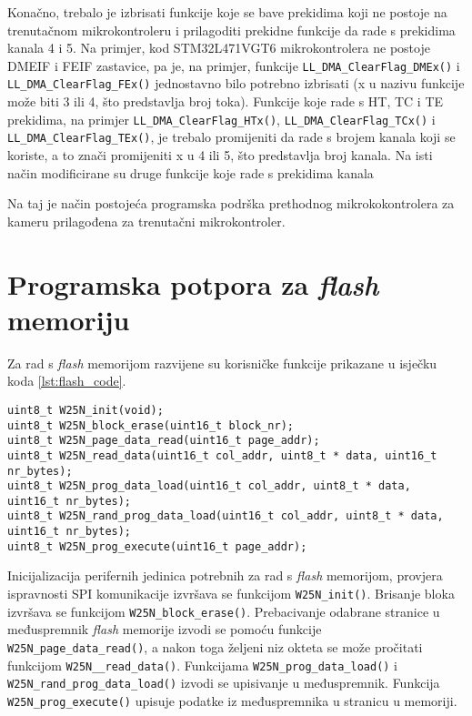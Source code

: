Konačno, trebalo je izbrisati funkcije koje se bave prekidima koji ne postoje na trenutačnom mikrokontroleru i prilagoditi prekidne funkcije da rade s prekidima kanala 4 i 5. Na primjer, kod STM32L471VGT6 mikrokontrolera ne postoje DMEIF i FEIF zastavice, pa je, na primjer, funkcije \verb|LL_DMA_ClearFlag_DMEx()| i \\ \verb|LL_DMA_ClearFlag_FEx()| jednostavno bilo potrebno izbrisati (x u nazivu funkcije može biti 3 ili 4, što predstavlja broj toka). Funkcije koje rade s HT, TC i TE prekidima, na primjer \verb|LL_DMA_ClearFlag_HTx()|, \verb|LL_DMA_ClearFlag_TCx()| i \\ \verb|LL_DMA_ClearFlag_TEx()|, je trebalo promijeniti da rade s brojem kanala koji se koriste, a to znači promijeniti x u 4 ili 5, što predstavlja broj kanala. Na isti način modificirane su druge funkcije koje rade s prekidima kanala

Na taj je način postojeća programska podrška prethodnog mikrokokontrolera za kameru prilagođena za trenutačni mikrokontroler.

\section{Programska potpora za \textit{flash} memoriju}


Za rad s \textit{flash} memorijom razvijene su korisničke funkcije prikazane u isječku koda \ref{lst:flash_code}.

\begin{lstlisting}[caption=Korisničke funkcije za \textit{flash} memoriju, label={lst:flash_code}]
uint8_t W25N_init(void);
uint8_t W25N_block_erase(uint16_t block_nr);
uint8_t W25N_page_data_read(uint16_t page_addr);
uint8_t W25N_read_data(uint16_t col_addr, uint8_t * data, uint16_t nr_bytes);
uint8_t W25N_prog_data_load(uint16_t col_addr, uint8_t * data, uint16_t nr_bytes);
uint8_t W25N_rand_prog_data_load(uint16_t col_addr, uint8_t * data, uint16_t nr_bytes);
uint8_t W25N_prog_execute(uint16_t page_addr);
\end{lstlisting}

\noindent Inicijalizacija perifernih jedinica potrebnih za rad s \textit{flash} memorijom, provjera ispravnosti SPI komunikacije izvršava se funkcijom \verb|W25N_init()|. Brisanje bloka izvršava se funkcijom \verb|W25N_block_erase()|. Prebacivanje odabrane stranice u međuspremnik \textit{flash} memorije izvodi se pomoću funkcije \verb|W25N_page_data_read()|, a nakon toga željeni niz okteta se može pročitati funkcijom \verb|W25N__read_data()|. Funkcijama \verb|W25N_prog_data_load()| i \verb|W25N_rand_prog_data_load()| izvodi se upisivanje u međuspremnik. Funkcija \verb|W25N_prog_execute()| upisuje podatke iz međuspremnika u stranicu u memoriji.


